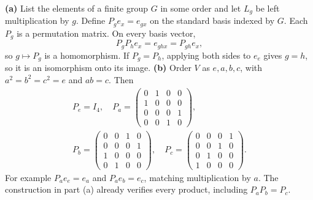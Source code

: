 \textbf{(a)} List the elements of a finite group $G$ in some order and let $L_g$ be left multiplication by $g$. Define $P_g e_x=e_{gx}$ on the standard basis indexed by $G$. Each $P_g$ is a permutation matrix. On every basis vector,
\[P_gP_h e_x=e_{ghx}=P_{gh}e_x,\]
so $g\mapsto P_g$ is a homomorphism. If $P_g=P_h$, applying both sides to $e_e$ gives $g=h$, so it is an isomorphism onto its image.
\textbf{(b)} Order $V$ as $e,a,b,c$, with $a^2=b^2=c^2=e$ and $ab=c$. Then
\[\begin{gathered}
P_e=I_4,\quad P_a=\begin{pmatrix}0&1&0&0\\1&0&0&0\\0&0&0&1\\0&0&1&0\end{pmatrix},\\
P_b=\begin{pmatrix}0&0&1&0\\0&0&0&1\\1&0&0&0\\0&1&0&0\end{pmatrix},\quad
P_c=\begin{pmatrix}0&0&0&1\\0&0&1&0\\0&1&0&0\\1&0&0&0\end{pmatrix}.
\end{gathered}\]
For example $P_a e_e=e_a$ and $P_a e_b=e_c$, matching multiplication by $a$. The construction in part (a) already verifies every product, including $P_aP_b=P_c$.
